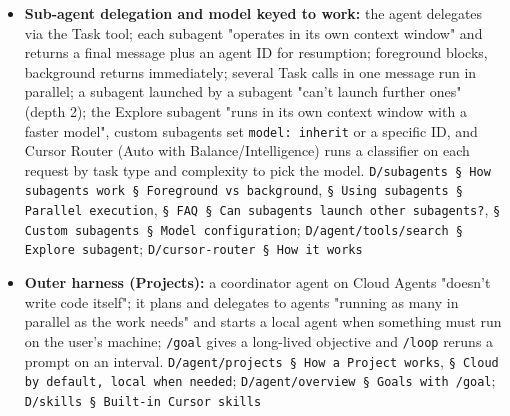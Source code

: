 \begin{itemize}
\item \textbf{Sub-agent delegation and model keyed to work:} the agent delegates via the Task tool; each subagent "operates in its own context window" and returns a final message plus an agent ID for resumption; foreground blocks, background returns immediately; several Task calls in one message run in parallel; a subagent launched by a subagent "can't launch further ones" (depth 2); the Explore subagent "runs in its own context window with a faster model", custom subagents set \texttt{model:\allowbreak{} inherit} or a specific ID, and Cursor Router (Auto with Balance/Intelligence) runs a classifier on each request by task type and complexity to pick the model. \texttt{D/\allowbreak{}subagents § How subagents work § Foreground vs background}, \texttt{§ Using subagents § Parallel execution}, \texttt{§ FAQ § Can subagents launch other subagents?}, \texttt{§ Custom subagents § Model configuration}; \texttt{D/\allowbreak{}agent/\allowbreak{}tools/\allowbreak{}search § Explore subagent}; \texttt{D/\allowbreak{}cursor-\allowbreak{}router § How it works}
\item \textbf{Outer harness (Projects):} a coordinator agent on Cloud Agents "doesn't write code itself"; it plans and delegates to agents "running as many in parallel as the work needs" and starts a local agent when something must run on the user's machine; \texttt{/\allowbreak{}goal} gives a long-lived objective and \texttt{/\allowbreak{}loop} reruns a prompt on an interval. \texttt{D/\allowbreak{}agent/\allowbreak{}projects § How a Project works}, \texttt{§ Cloud by default, local when needed}; \texttt{D/\allowbreak{}agent/\allowbreak{}overview § Goals with /\allowbreak{}goal}; \texttt{D/\allowbreak{}skills § Built-\allowbreak{}in Cursor skills}
\end{itemize}

